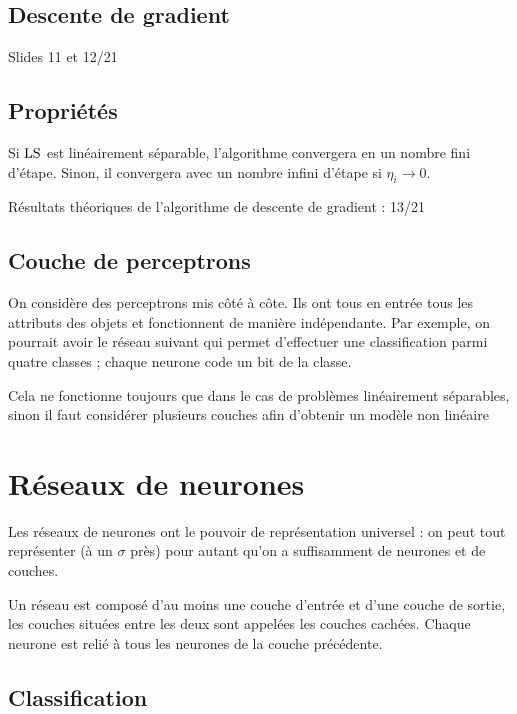	\subsection{Descente de gradient}
	
	Slides 11 et 12/21
	
	\subsection{Propriétés}
	
	Si $\text{LS}$ est linéairement séparable, l'algorithme convergera en un nombre fini d'étape. Sinon, il convergera avec un nombre infini d'étape si $\eta_i \rightarrow 0$.
	
	Résultats théoriques de l'algorithme de descente de gradient : 13/21
	
	\subsection{Couche de perceptrons}
	
	On considère des perceptrons mis côté à côte. Ils ont tous en entrée tous les attributs des objets et fonctionnent de manière indépendante. Par exemple, on pourrait avoir le réseau suivant qui permet d'effectuer une classification parmi quatre classes ; chaque neurone code un bit de la classe.
	
	
	Cela ne fonctionne toujours que dans le cas de problèmes linéairement séparables, sinon il faut considérer plusieurs couches afin d'obtenir un modèle non linéaire

\section{Réseaux de neurones}

Les réseaux de neurones ont le pouvoir de représentation universel : on peut tout représenter (à un $\sigma$ près) pour autant qu'on a suffisamment de neurones et de couches.

Un réseau est composé d'au moins une couche d'entrée et d'une couche de sortie, les couches situées entre les deux sont appelées les couches cachées. Chaque neurone est relié à tous les neurones de la couche précédente.

	\subsection{Classification}
	

